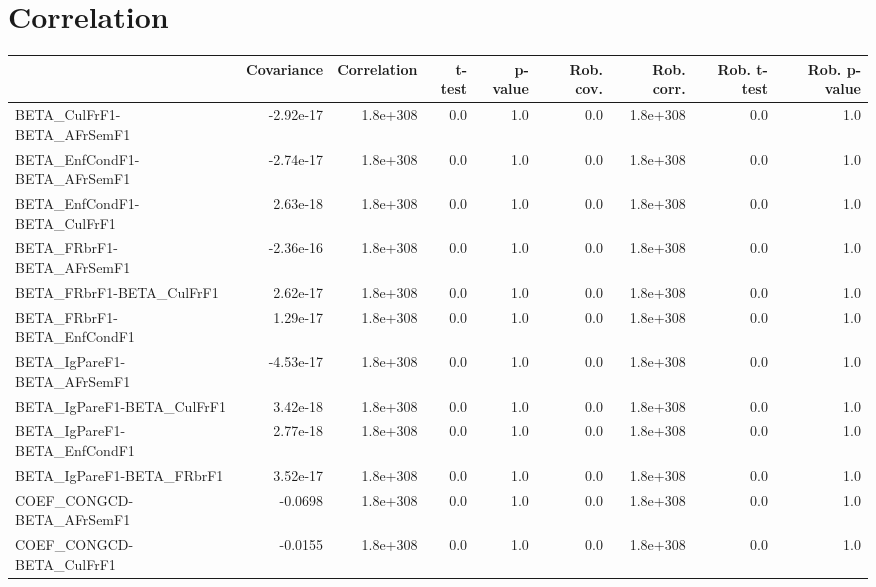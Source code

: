 \section{Correlation}
\begin{tabular}{lrrrrrrrr}
\toprule
{} &  Covariance &  Correlation &  t-test &  p-value &  Rob. cov. &  Rob. corr. &  Rob. t-test &  Rob. p-value \\
\midrule
BETA\_CulFrF1-BETA\_AFrSemF1           &   -2.92e-17 &     1.8e+308 &     0.0 &      1.0 &        0.0 &    1.8e+308 &          0.0 &           1.0 \\
BETA\_EnfCondF1-BETA\_AFrSemF1         &   -2.74e-17 &     1.8e+308 &     0.0 &      1.0 &        0.0 &    1.8e+308 &          0.0 &           1.0 \\
BETA\_EnfCondF1-BETA\_CulFrF1          &    2.63e-18 &     1.8e+308 &     0.0 &      1.0 &        0.0 &    1.8e+308 &          0.0 &           1.0 \\
BETA\_FRbrF1-BETA\_AFrSemF1            &   -2.36e-16 &     1.8e+308 &     0.0 &      1.0 &        0.0 &    1.8e+308 &          0.0 &           1.0 \\
BETA\_FRbrF1-BETA\_CulFrF1             &    2.62e-17 &     1.8e+308 &     0.0 &      1.0 &        0.0 &    1.8e+308 &          0.0 &           1.0 \\
BETA\_FRbrF1-BETA\_EnfCondF1           &    1.29e-17 &     1.8e+308 &     0.0 &      1.0 &        0.0 &    1.8e+308 &          0.0 &           1.0 \\
BETA\_IgPareF1-BETA\_AFrSemF1          &   -4.53e-17 &     1.8e+308 &     0.0 &      1.0 &        0.0 &    1.8e+308 &          0.0 &           1.0 \\
BETA\_IgPareF1-BETA\_CulFrF1           &    3.42e-18 &     1.8e+308 &     0.0 &      1.0 &        0.0 &    1.8e+308 &          0.0 &           1.0 \\
BETA\_IgPareF1-BETA\_EnfCondF1         &    2.77e-18 &     1.8e+308 &     0.0 &      1.0 &        0.0 &    1.8e+308 &          0.0 &           1.0 \\
BETA\_IgPareF1-BETA\_FRbrF1            &    3.52e-17 &     1.8e+308 &     0.0 &      1.0 &        0.0 &    1.8e+308 &          0.0 &           1.0 \\
COEF\_CONGCD-BETA\_AFrSemF1            &     -0.0698 &     1.8e+308 &     0.0 &      1.0 &        0.0 &    1.8e+308 &          0.0 &           1.0 \\
COEF\_CONGCD-BETA\_CulFrF1             &     -0.0155 &     1.8e+308 &     0.0 &      1.0 &        0.0 &    1.8e+308 &          0.0 &           1.0 \\

\end{tabular}
